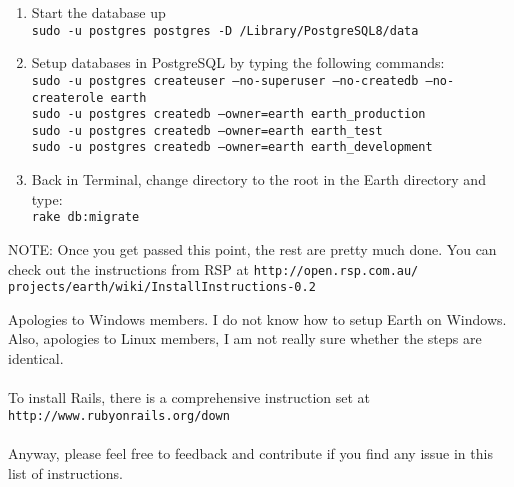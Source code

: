 \documentclass{letter}
\begin{document}
\begin{enumerate}
\begin{enumerate}
	{\sl Thanks to David Hemer.}
	\item Start the database up \\
	{\tt sudo -u postgres postgres -D /Library/PostgreSQL8/data}
	\item Setup databases in PostgreSQL by typing the following commands: \\
	{\tt sudo -u postgres createuser --no-superuser --no-createdb --no-createrole earth} \\
	{\tt sudo -u postgres createdb --owner=earth earth\_production} \\
	{\tt sudo -u postgres createdb --owner=earth earth\_test} \\
	{\tt sudo -u postgres createdb --owner=earth earth\_development}
	\item Back in Terminal, change directory to the root in the Earth directory and type: \\
	{\tt rake db:migrate}
	\end{enumerate}
	NOTE: Once you get passed this point, the rest are pretty much done. You can check out the instructions from RSP at {\tt http://open.rsp.com.au/\\projects/earth/wiki/InstallInstructions-0.2}
\end{enumerate} 
Apologies to Windows members. I do not know how to setup Earth on Windows. Also, apologies to Linux members, I am not really sure whether the steps are identical. \\\\
To install Rails, there is a comprehensive instruction set at {\tt http://www.rubyonrails.org/down} \\\\
Anyway, please feel free to feedback and contribute if you find any issue in this list of instructions. 
\end{document}
